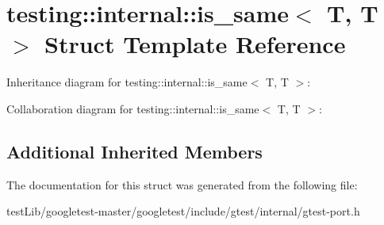 \hypertarget{structtesting_1_1internal_1_1is__same_3_01T_00_01T_01_4}{}\section{testing\+:\+:internal\+:\+:is\+\_\+same$<$ T, T $>$ Struct Template Reference}
\label{structtesting_1_1internal_1_1is__same_3_01T_00_01T_01_4}


Inheritance diagram for testing\+:\+:internal\+:\+:is\+\_\+same$<$ T, T $>$\+:


Collaboration diagram for testing\+:\+:internal\+:\+:is\+\_\+same$<$ T, T $>$\+:
\subsection*{Additional Inherited Members}


The documentation for this struct was generated from the following file\+:\begin{DoxyCompactItemize}
\item 
test\+Lib/googletest-\/master/googletest/include/gtest/internal/gtest-\/port.\+h\end{DoxyCompactItemize}
